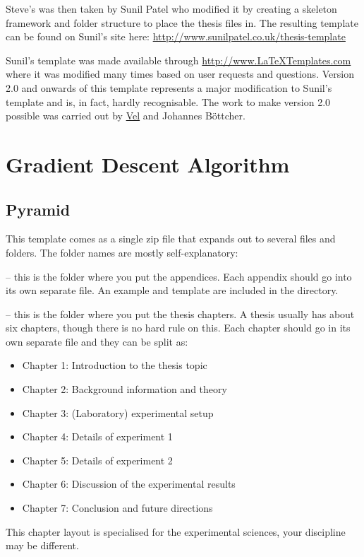 Steve's  was then taken by Sunil Patel who modified it by creating a skeleton framework and folder structure to place the thesis files in. The resulting template can be found on Sunil's site here:
\url{http://www.sunilpatel.co.uk/thesis-template}

Sunil's template was made available through \url{http://www.LaTeXTemplates.com} where it was modified many times based on user requests and questions. Version 2.0 and onwards of this template represents a major modification to Sunil's template and is, in fact, hardly recognisable. The work to make version 2.0 possible was carried out by \href{mailto:vel@latextemplates.com}{Vel} and Johannes Böttcher.


\section{Gradient Descent Algorithm}

\subsection{Pyramid}

This template comes as a single zip file that expands out to several files and folders. The folder names are mostly self-explanatory:

 -- this is the folder where you put the appendices. Each appendix should go into its own separate  file. An example and template are included in the directory.

 -- this is the folder where you put the thesis chapters. A thesis usually has about six chapters, though there is no hard rule on this. Each chapter should go in its own separate  file and they can be split as:
\begin{itemize}
\item Chapter 1: Introduction to the thesis topic
\item Chapter 2: Background information and theory
\item Chapter 3: (Laboratory) experimental setup
\item Chapter 4: Details of experiment 1
\item Chapter 5: Details of experiment 2
\item Chapter 6: Discussion of the experimental results
\item Chapter 7: Conclusion and future directions
\end{itemize}
This chapter layout is specialised for the experimental sciences, your discipline may be different.

